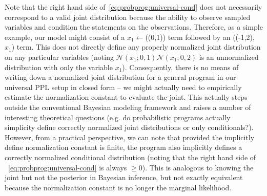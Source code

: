 Note that the right hand side of~\eqref{eq:probprog:universal-cond} does not necessarily
correspond to a valid joint distribution because the ability to observe sampled variables and
condition the \sample statements on the observations.  Therefore, as a simple example, our model
might consist of a $x_1 \leftarrow$\sample(\normal(0,1)) term followed by an \observe(\normal(-1,2),~$x_1$)
term.  This does not directly define any properly normalized joint distribution on any particular variables
(noting $\mathcal{N}(x_1;0,1) \mathcal{N}(x_1;0,2)$ is an unnormalized distribution with only the variable
$x_1$).  Consequently, there is no means of writing down a normalized joint distribution for a general
program in our universal PPL setup in closed form -- we might actually need to empirically estimate
the normalization constant to evaluate the joint.  This actually steps outside the conventional Bayesian
modeling framework and raises a number of interesting theoretical questions (e.g. do probabilistic
programs actually simplicity define correctly normalized joint distributions or only conditionals?).  However, from a
practical perspective, we can note that provided the implicitly define normalization constant is finite,
the program also implicitly defines a correctly normalized conditional distribution (noting that the right
hand side of ~\eqref{eq:probprog:universal-cond} is always $\ge0$).
This is analogous to knowing the joint but not the posterior in Bayesian inference, but not exactly
equivalent because the normalization constant is no longer the marginal likelihood.

